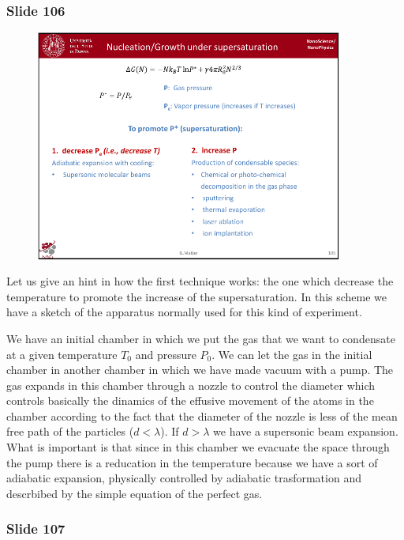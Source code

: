 \documentclass[../main/main.tex]{subfiles}
\begin{document}
\newpage

\subsubsection{Slide 106}

\begin{figure}[h!]
\centering
\includegraphics[page=2,width=0.9\textwidth]{../lessons/pdf_file/7_lesson.pdf}
\end{figure}

Let us give an hint in how the first technique works: the one which decrease the temperature to promote the increase of the supersaturation. In this scheme we have a sketch of the apparatus normally used for this kind of experiment.

We have an initial chamber in which we put the gas that we want to condensate at a given temperature \( T_0 \) and pressure \( P_0 \). We can let the gas in the initial chamber in another chamber in which we have made vacuum with a pump. The gas expands in this chamber through a nozzle to control the diameter which controls basically the dinamics of the effusive movement of the atoms in the chamber according to the fact that the diameter of the nozzle is less of the mean free path of the particles (\( d < \lambda  \)). If \( d > \lambda  \) we have a supersonic beam expansion. What is important is that since in this chamber we evacuate the space through the pump there is a reducation in the temperature because we have a sort of adiabatic expansion, physically controlled by adiabatic trasformation and descrbibed by the simple equation of the perfect gas.

\newpage

\subsubsection{Slide 107}
\end{document}
